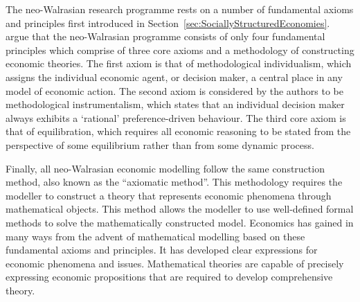 The neo-Walrasian research programme rests on a number of fundamental axioms and principles first introduced in Section~\ref{sec:SociallyStructuredEconomies}. \citet{Arnsperger2006} argue that the neo-Walrasian programme consists of only four fundamental principles which comprise of three core axioms and a methodology of constructing economic theories. The first axiom is that of methodological individualism, which assigns the individual economic agent, or decision maker, a central place in any model of economic action. The second axiom is considered by the authors to be methodological instrumentalism, which states that an individual decision maker always exhibits a `rational' preference-driven behaviour. The third core axiom is that of equilibration, which requires all economic reasoning to be stated from the perspective of some equilibrium rather than from some dynamic process.

Finally, all neo-Walrasian economic modelling follow the same construction method, also known as the ``axiomatic method''. This methodology requires the modeller to construct a theory that represents economic phenomena through mathematical objects. This method allows the modeller to use well-defined formal methods to solve the mathematically constructed model. Economics has gained in many ways from the advent of mathematical modelling based on these fundamental axioms and principles. It has developed clear expressions for economic phenomena and issues. Mathematical theories are capable of precisely expressing economic propositions that are required to develop comprehensive theory.

